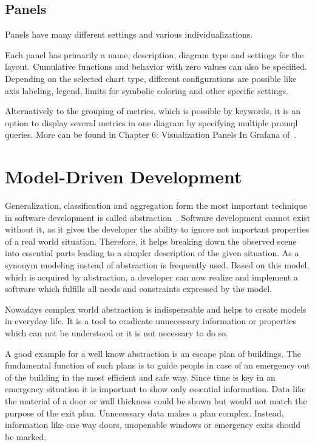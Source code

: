 \subsection{Panels}

Panels have many different settings and various individualizations. 

Each panel has primarily a name, description, diagram type and settings for the layout. Cumulative functions and behavior with zero values can also be specified. Depending on the selected chart type, different configurations are possible like axis labeling, legend, limits for symbolic coloring and other specific settings.

Alternatively to the grouping of metrics, which is possible by keywords, it is an option to display several metrics in one diagram by specifying multiple \gls{promql} queries. More can be found in  Chapter 6: Visualization Panels In Grafana of~\cite{Salituro2020}.

\section{Model-Driven Development}

Generalization, classification and aggregation form the most important technique in software development is called abstraction~\cite{Brambilla_2017}. Software development cannot exist without it, as it gives the developer the ability to ignore not important properties of a real world situation. Therefore, it helps breaking down the observed scene into essential parts leading to a simpler description of the given situation. As a synonym modeling instead of abstraction is frequently used. Based on this model, which is acquired by abstraction, a developer can now realize and implement a software which fulfills all needs and constraints expressed by the model. 

Nowadays complex world abstraction is indispensable and helps to create models in everyday life. It is a tool to eradicate unnecessary information or properties which can not be understood or it is not necessary to do so. 

A good example for a well know abstraction is an escape plan of buildings. The fundamental function of such plans is to guide people in case of an emergency out of the building in the most efficient and safe way. Since time is key in an emergency situation it is important to show only essential information. Data like the material of a door or wall thickness could be shown but would not match the purpose of the exit plan. Unnecessary data makes a plan complex. Instead, information like one way doors, unopenable windows or emergency exits should be marked. 

